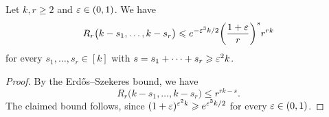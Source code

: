 \begin{lemma}
  \label{lem:many:ESz:steps} %
  Let\/ $k,r \ge 2$ and\/ $\varepsilon \in (0,1)$. We have 
  $$R_r\big( k - s_1, \ldots, k - s_r \big) \leqslant e^{-\varepsilon^3 k / 2} \bigg( \frac{1+\varepsilon}{r} \bigg)^s r^{rk}$$
  for every $s_1,\ldots,s_r \in [k]$ with\/ $s = s_1 + \cdots + s_r \geqslant \varepsilon^2 k$.
\end{lemma}
%
\begin{proof}
  By the Erd\H{o}s--Szekeres bound, we have
  $$R_r\big( k - s_1, \ldots, k - s_r \big) \le r^{rk - s}.$$
  The claimed bound follows, since $( 1 + \varepsilon )^{\varepsilon^2 k} \geqslant e^{\varepsilon^3 k/2}$ for every $\varepsilon \in (0,1)$.
\end{proof}


